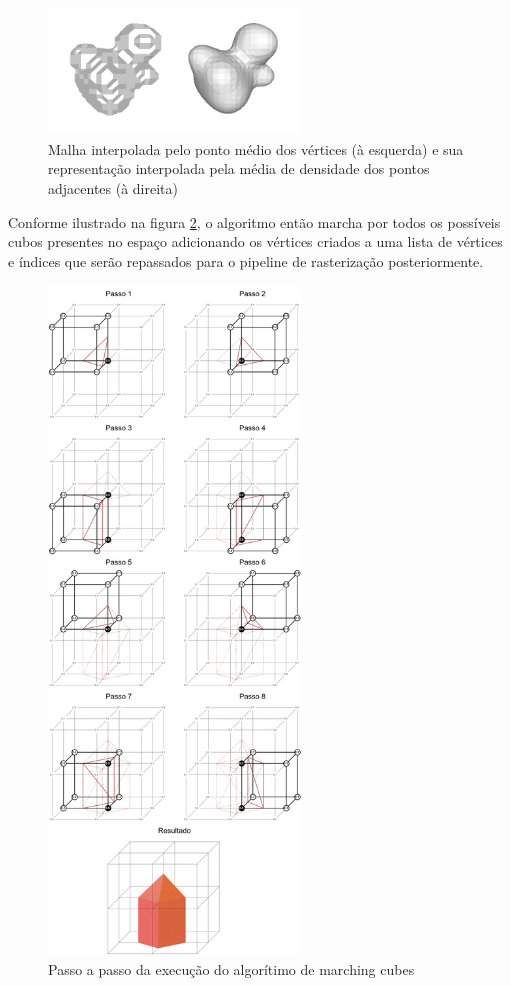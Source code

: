 \begin{figure}
\centering
\includegraphics[width=0.6\textwidth]{imagens/PontoMedioXInterpolado.png}
\caption{Malha interpolada pelo ponto médio dos vértices (à esquerda) e sua representação interpolada pela média de densidade dos pontos adjacentes (à direita) }
\label{fig:LABEL_FIG_INTERPOLACAO}
\end{figure}

Conforme ilustrado na figura \ref{fig:LABEL_FIG_EXECUCAO_ALGORITIMO}, o algoritmo então marcha por todos os possíveis cubos presentes no espaço adicionando os vértices criados a uma lista de vértices e índices que serão repassados para o pipeline de rasterização posteriormente.

\begin{figure}
\centering
\includegraphics[width=0.6\textwidth]{imagens/MarchingCubes-Execucao.png}
\caption{Passo a passo da execução do algorítimo de marching cubes}
\label{fig:LABEL_FIG_EXECUCAO_ALGORITIMO}
\end{figure}

